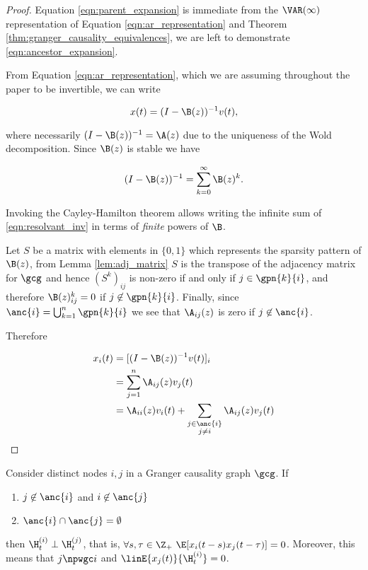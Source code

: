 \begin{proof}
  Equation \eqref{eqn:parent_expansion} is immediate from the
  $\VAR(\infty)$ representation of Equation \eqref{eqn:ar_representation}
  and Theorem \ref{thm:granger_causality_equivalences}, we are left to
  demonstrate \eqref{eqn:ancestor_expansion}.
  
  From Equation \eqref{eqn:ar_representation}, which we are assuming
  throughout the paper to be invertible, we can write

  \begin{equation*}
    x(t) = (I - \B(z))^{-1} v(t),
  \end{equation*}

  where necessarily $(I - \B(z))^{-1} = \A(z)$ due to the uniqueness
  of the Wold decomposition.  Since $\B(z)$ is stable we have

  \begin{equation}
    \label{eqn:resolvant_inv}
    (I - \B(z))^{-1} = \sum_{k = 0}^\infty \B(z)^k.
  \end{equation}

  Invoking the Cayley-Hamilton theorem allows writing the infinite sum
  of \eqref{eqn:resolvant_inv} in terms of \textit{finite} powers of
  $\B$.

  Let $S$ be a matrix with elements in $\{0, 1\}$ which represents the
  sparsity pattern of $\B(z)$, from Lemma \ref{lem:adj_matrix} $S$ is
  the transpose of the adjacency matrix for $\gcg$ and hence
  $(S^k)_{ij}$ is non-zero if and only if $j \in \gpn{k}{i}$, and
  therefore $\B(z)^k_{ij} = 0$ if $j \not \in \gpn{k}{i}$.  Finally,
  since $\anc{i} = \bigcup_{k = 1}^n\gpn{k}{i}$ we see that
  $\A_{ij}(z)$ is zero if $j \not\in \anc{i}$.

  Therefore

  \begin{align*}
    x_i(t) &= [(I - \B(z))^{-1}v(t)]_i\\
           &= \sum_{j = 1}^n \A_{ij}(z) v_j(t)\\
           &= \A_{ii}(z) v_i(t) + \sum_{\substack{j \in \anc{i} \\ j \ne i}} \A_{ij}(z) v_j(t)
  \end{align*}
\end{proof}

\begin{proposition}
  \label{prop:separated_ancestor_uncorrelated}
  Consider distinct nodes $i, j$ in a Granger causality graph
  $\gcg$.  If

  \begin{enumerate}[label=(\alph*)]
  \item{$j \not\in \anc{i}$ and $i \not\in \anc{j}$}
  \item{$\anc{i}\cap\anc{j} = \emptyset$}
  \end{enumerate}

  then $\H_t^{(i)} \perp \H_t^{(j)}$, that is,
  $\forall s, \tau \in \Z_+\ \E[x_i(t - s)x_j(t - \tau)] = 0$.  Moreover,
  this means that $j \npwgc i$ and $\linE{x_j(t)}{\H_t^{(i)}} = 0$.
\end{proposition}


